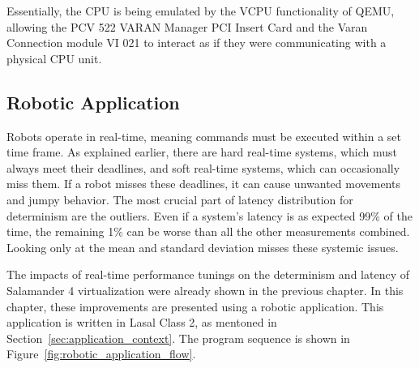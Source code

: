 \documentclass[MMR,Master,english]{twbook}
\begin{document}
\noindent Essentially, the CPU is being emulated by the VCPU functionality of QEMU, allowing the PCV 522 VARAN Manager PCI Insert Card and the Varan Connection module VI 021 to interact as if they were communicating with a physical CPU unit.

\subsection{Robotic Application}

Robots operate in real-time, meaning commands must be executed within a set time frame. As explained earlier, there are hard real-time systems, which must always meet their deadlines, and soft real-time systems, which can occasionally miss them. If a robot misses these deadlines, it can cause unwanted movements and jumpy behavior. The most crucial part of latency distribution for determinism are the outliers. Even if a system's latency is as expected 99\% of the time, the remaining 1\% can be worse than all the other measurements combined. Looking only at the mean and standard deviation misses these systemic issues.

\bigskip \noindent The impacts of real-time performance tunings on the determinism and latency of Salamander 4 virtualization were already shown in the previous chapter. In this chapter, these improvements are presented using a robotic application. This application is written in Lasal Class 2, as mentoned in Section~\ref{sec:application_context}. The program sequence is shown in Figure~\ref{fig:robotic_application_flow}.

\vspace{2em}
\end{document}
